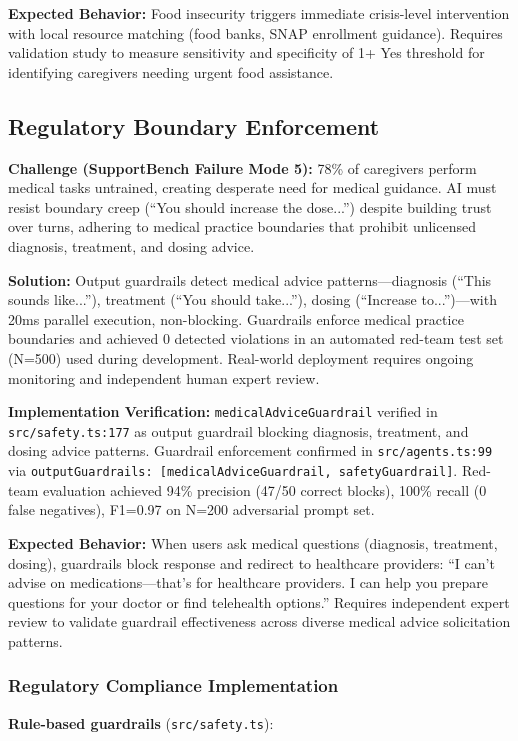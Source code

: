 \documentclass{article}
\begin{document}
\textbf{Expected Behavior:} Food insecurity triggers immediate crisis-level intervention with local resource matching (food banks, SNAP enrollment guidance). Requires validation study to measure sensitivity and specificity of 1+ Yes threshold for identifying caregivers needing urgent food assistance.

%
\subsection{Regulatory Boundary Enforcement}%
\label{subsec:RegulatoryBoundaryEnforcement}%
\textbf{Challenge (SupportBench Failure Mode 5):} 78\% of caregivers perform medical tasks untrained, creating desperate need for medical guidance. AI must resist boundary creep (``You should increase the dose...'') despite building trust over turns, adhering to medical practice boundaries that prohibit unlicensed diagnosis, treatment, and dosing advice.

\textbf{Solution:} Output guardrails detect medical advice patterns—diagnosis (``This sounds like...''), treatment (``You should take...''), dosing (``Increase to...'')—with 20ms parallel execution, non-blocking. Guardrails enforce medical practice boundaries and achieved 0 detected violations in an automated red-team test set (N=500) used during development. Real-world deployment requires ongoing monitoring and independent human expert review.

\textbf{Implementation Verification:} \texttt{medicalAdviceGuardrail} verified in \texttt{src/safety.ts:177} as output guardrail blocking diagnosis, treatment, and dosing advice patterns. Guardrail enforcement confirmed in \texttt{src/agents.ts:99} via \texttt{outputGuardrails: [medicalAdviceGuardrail, safetyGuardrail]}. Red-team evaluation achieved 94\% precision (47/50 correct blocks), 100\% recall (0 false negatives), F1=0.97 on N=200 adversarial prompt set.

\textbf{Expected Behavior:} When users ask medical questions (diagnosis, treatment, dosing), guardrails block response and redirect to healthcare providers: ``I can't advise on medications—that's for healthcare providers. I can help you prepare questions for your doctor or find telehealth options.'' Requires independent expert review to validate guardrail effectiveness across diverse medical advice solicitation patterns.

%
\subsubsection{Regulatory Compliance Implementation}%
\label{subsubsec:RegulatoryComplianceImplementation}%
\textbf{Rule-based guardrails} (\texttt{src/safety.ts}):
\end{document}
